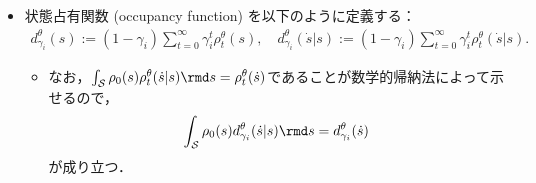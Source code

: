 \documentclass[a4paper,10pt,dvipdfmx]{jsarticle}
\begin{document}
\begin{itemize}
\begin{subequations}
\begin{align}
        &\rho_{t+1}^\theta(\dot{s}|s):=\int_{\mathcal{S}}\int_{\mathcal{A}}\int_{\mathcal{B}}\rho_t^\theta(s_t|s)f_{\theta_1}(a_t|s_t)g_{\theta_2}(b_t|s_t,a_t)p(\dot{s}|s_t,a_t,b_t)\rmd s_t\rmd a_t\rmd b_t.
    \end{align}
    \end{subequations}
    \begin{itemize}
        \item なお，
        \begin{align}
            \rho_{t+1}^\theta(\dot{s}|s)=\int_{\mathcal{S}}\int_{\mathcal{A}}\int_{\mathcal{B}}f_{\theta_1}(a|s)g_{\theta_2}(b|s,a)p(s'|s,a,b)\rho_t^\theta(\dot{s}|s')\rmd s'\rmd a\rmd b\label{eq:alt_def_rho}
        \end{align}
        であることが数学的帰納法から示せるので，を定義としてもよい．
    \end{itemize}
    \item 状態占有関数 (occupancy function) を以下のように定義する：
    \begin{gather}
        d_{\gamma_i}^{\theta}(s):=(1-\gamma_i)\sum_{t=0}^\infty \gamma_i^t\rho_t^\theta(s),\quad
        d_{\gamma_i}^{\theta}(\dot{s}|s):=(1-\gamma_i)\sum_{t=0}^\infty \gamma_i^t\rho_t^\theta(\dot{s}|s).
    \end{gather}
    \begin{itemize}
        \item なお，$\int_{\mathcal{S}}\rho_0(s)\rho_t^{\theta}(\dot{s}|s)\rmd s=\rho_t^{\theta}(\dot{s})$であることが数学的帰納法によって示せるので，$$\int_{\mathcal{S}}\rho_0(s)d_{\gamma_i}^{\theta}(\dot{s}|s)\rmd s=d_{\gamma_i}^{\theta}(\dot{s})$$が成り立つ．
    \end{itemize}


\end{itemize}
\end{document}

